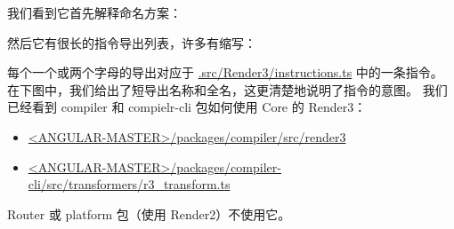 
我们看到它首先解释命名方案：




然后它有很长的指令导出列表，许多有缩写：




每个一个或两个字母的导出对应于
\href{https://github.com/angular/angular/blob/master/packages/core/src/render3/instructions.ts}
{.src/Render3/instructions.ts}
中的一条指令。
在下图中，我们给出了短导出名称和全名，这更清楚地说明了指令的意图。
我们已经看到 compiler 和 compielr-cli 包如何使用 Core 的 Render3：

\begin{itemize}
  \item \href{https://github.com/angular/angular/tree/master/packages/compiler/src/render3}
        {<ANGULAR-MASTER>/packages/compiler/src/render3}
  \item \href{https://github.com/angular/angular/blob/master/packages/compiler-cli/src/transformers/r3_transform.ts}
        {<ANGULAR-MASTER>/packages/compiler-cli/src/transformers/r3\_transform.ts}
\end{itemize}


Router 或 platform 包（使用 Render2）不使用它。

